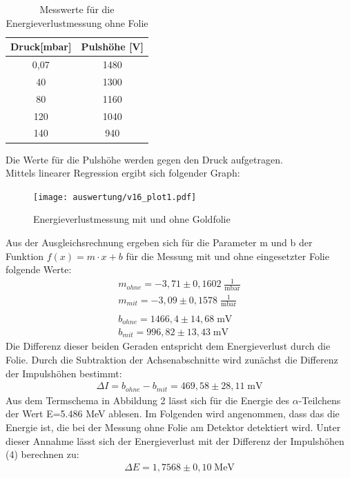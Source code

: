 \begin{table}[H] 
	\centering
	\begin{tabular}{c|c}

	Druck[mbar] & Pulshöhe  [V] \\ 
		\hline 
0,07	& 1480\\
40	& 1300\\
80	& 1160\\
120	& 1040\\
140	& 940\\
	
	\end{tabular} 
	\caption{Messwerte für die Energieverlustmessung ohne Folie } 
\end{table} 

Die Werte für die Pulshöhe werden gegen den Druck aufgetragen. \\ Mittels linearer Regression ergibt sich folgender Graph:   
\begin{figure}[h]
	\centering
	\texttt{[image: auswertung/v16\_plot1.pdf]}
	\caption{Energieverlustmessung mit und ohne Goldfolie}
	\label{img:grafik-dummy}
\end{figure}
\newpage 
Aus der Ausgleichsrechnung ergeben sich für die Parameter m und b der Funktion $f(x)=m\cdot x+b$ für die Messung mit und ohne eingesetzter Folie folgende Werte: 
\begin{align*}
m_{ohne}= -3,71 \pm 0,1602 \; \frac{1}{\text{mbar}}
\\
m_{mit}= -3,09 \pm 0,1578 \; \frac{1}{\text{mbar}}
\\
\\
b_{ohne}= 1466,4 \pm 14,68 \; \text{mV}
\\
b_{mit}= 996,82 \pm  13,43 \; \text{mV}
\end{align*}
Die Differenz dieser beiden Geraden entspricht dem Energieverlust durch die Folie. Durch die Subtraktion der Achsenabschnitte wird zunächst die Differenz der Impulshöhen bestimmt: 
\begin{align}
\Delta I= b_{ohne}-b_{mit}= 469,58 \pm 28,11 \; \text{mV}
\end{align} 
Aus dem Termschema in Abbildung 2 lässt sich für die Energie des $\alpha$-Teilchens der Wert E=5.486 MeV ablesen. Im Folgenden wird angenommen, dass das die Energie ist, die bei der Messung ohne Folie am Detektor detektiert wird. Unter dieser Annahme lässt sich der Energieverlust mit der Differenz der Impulshöhen (4) berechnen zu: 
\begin{align*}
\Delta E= 1,7568 \pm 0,10\;  \text{MeV}  
\end{align*} 

